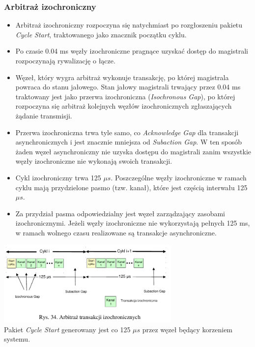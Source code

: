 \subsubsection{Arbitraż izochroniczny}
\begin{itemize}
	\item Arbitraż izochroniczny rozpoczyna się natychmiast po rozgłoszeniu pakietu \emph{Cycle Start}, traktowanego jako znacznik początku cyklu.
	\item Po czasie 0.04 ms węzły izochroniczne pragnące uzyskać dostęp do magistrali rozpoczynają rywalizację o łącze.
	\item Węzeł, który wygra arbitraż wykonuje transakcję, po której magistrala powraca do stanu jałowego. Stan jałowy magistrali trwający przez 0.04 ms traktowany jest jako przerwa izochroniczna (\emph{Isochronous Gap}), po której rozpoczyna się arbitraż kolejnych węzłów izochronicznych zgłaszających żądanie transmisji.
	\item Przerwa izochroniczna trwa tyle samo, co \emph{Acknowledge Gap} dla transakcji asynchronicznych i jest znacznie mniejsza od \emph{Subaction Gap}. W ten sposób żaden węzeł asynchroniczny nie uzyska dostępu do magistrali zanim wszystkie węzły izochroniczne nie wykonają swoich transakcji.
	\item Cykl izochroniczny trwa 125 $\mu{s}$. Poszczególne węzły izochroniczne w ramach cyklu mają przydzielone pasmo (tzw. kanał), które jest częścią interwału 125 $\mu{s}$.
	\item Za przydział pasma odpowiedzialny jest węzeł zarządzający zasobami izochronicznymi. Jeżeli węzły izochroniczne nie wykorzystają pełnych 125 ms, w ramach wolnego czasu realizowane są transakcje asynchroniczne.
\end{itemize}
\includegraphics[width=9cm]{./wyklady/FIREWIRE_43_1.pdf}\\
Pakiet \emph{Cycle Start} generowany jest co 125 $\mu{s}$ przez węzeł będący korzeniem systemu.
